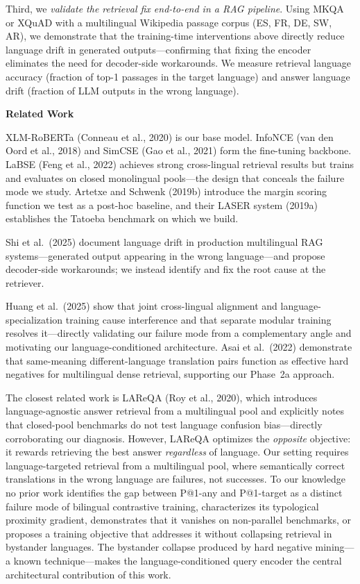 \documentclass[11pt]{article}
\begin{document}
Third, we \textit{validate the retrieval fix end-to-end in a RAG pipeline}. Using MKQA
or XQuAD with a multilingual Wikipedia passage corpus (ES, FR, DE, SW, AR), we
demonstrate that the training-time interventions above directly reduce language drift in
generated outputs---confirming that fixing the encoder eliminates the need for decoder-side
workarounds. We measure retrieval language accuracy (fraction of top-1 passages in the
target language) and answer language drift (fraction of LLM outputs in the wrong language).

\textbf{Related Work}

XLM-RoBERTa (Conneau et al., 2020) is our base model. InfoNCE (van den Oord et al., 2018)
and SimCSE (Gao et al., 2021) form the fine-tuning backbone. LaBSE (Feng et al., 2022)
achieves strong cross-lingual retrieval results but trains and evaluates on closed
monolingual pools---the design that conceals the failure mode we study. Artetxe and Schwenk
(2019b) introduce the margin scoring function we test as a post-hoc baseline, and their
LASER system (2019a) establishes the Tatoeba benchmark on which we build.

Shi et al.\ (2025) document language drift in production multilingual RAG
systems---generated output appearing in the wrong language---and propose decoder-side
workarounds; we instead identify and fix the root cause at the retriever.

Huang et al.\ (2025) show that joint cross-lingual alignment and language-specialization
training cause interference and that separate modular training resolves it---directly
validating our failure mode from a complementary angle and motivating our language-conditioned
architecture. Asai et al.\ (2022) demonstrate that same-meaning different-language
translation pairs function as effective hard negatives for multilingual dense retrieval,
supporting our Phase~2a approach.

The closest related work is LAReQA (Roy et al., 2020), which introduces language-agnostic
answer retrieval from a multilingual pool and explicitly notes that closed-pool benchmarks
do not test language confusion bias---directly corroborating our diagnosis. However,
LAReQA optimizes the \emph{opposite} objective: it rewards retrieving the best answer
\emph{regardless} of language. Our setting requires language-targeted retrieval from a
multilingual pool, where semantically correct translations in the wrong language are
failures, not successes. To our knowledge no prior work identifies the gap between
P@1-any and P@1-target as a distinct failure mode of bilingual contrastive training,
characterizes its typological proximity gradient, demonstrates that it vanishes on
non-parallel benchmarks, or proposes a training objective that addresses it without
collapsing retrieval in bystander languages. The bystander collapse produced by hard
negative mining---a known technique---makes the language-conditioned query encoder the
central architectural contribution of this work.
\end{document}

